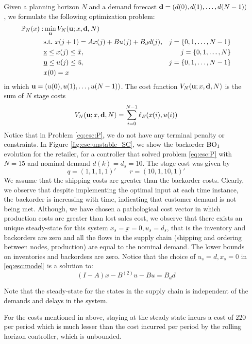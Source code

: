 Given a planning horizon $N$ and a demand forecast $\mathbf{d} = 
(d(0),d(1),\ldots,d(N-1))$, we formulate the following
optimization problem:
\begin{alignat}{2}
\label{eq:esc:P}
\mathbb{P}_N(x):& \min_{\mathbf{u}}{V_N(\mathbf{u};x,\mathbf{d},N)}& \nonumber \\
&\text{s.t.~} x(j+1) = Ax(j) + Bu(j)+B_dd(j),& j =\left\lbrace 0,1,\ldots,N-1 \right\rbrace\nonumber\\
&\underbar{x} \leq x(j) \leq \bar{x},& j = \left\lbrace 0,1,\ldots,N \right\rbrace  \\
&\underbar{u} \leq u(j) \leq \bar{u},&j = \left\lbrace  0,1,\ldots,N-1 \right\rbrace\nonumber \\
& x(0) = x & \nonumber
\end{alignat}
in which $\mathbf{u} = (u(0),u(1),\ldots,u(N-1))$. The cost function
$V_N(\mathbf{u};x,\mathbf{d},N)$ is the sum of $N$ stage costs
\[V_N(\mathbf{u};x,\mathbf{d},N) =  \sum_{i=0}^{N-1}
  \ell_E(x(i),u(i))\]
Notice that in Problem \eqref{eq:esc:P}, we do not have any terminal
penalty or constraints. In Figure \ref{fig:esc:unstable_SC}, we show
the backorder $\textrm{BO}_1$ evolution for the retailer, for a controller
that solved problem \eqref{eq:esc:P} with $N=15$ and nominal demand
$d(k) =d_s= 10$. The stage cost was given by 
\[ q = (1,1,1,1)' \qquad r = (10,1,10,1)' \]
We assume that the shipping costs are greater than the backorder
costs. Clearly, we observe that despite implementing the optimal input at
each time instance, the backorder is increasing with time, indicating
that customer demand is not being met. Although, we have chosen a
pathological cost vector in which production costs are greater than
lost sales cost, we observe that there exists an unique steady-state
for this system $x_s = \underbar{x}=0, u_s = d_s$, that is the inventory
and backorders are zero and all the flows in the supply chain
(shipping and ordering between nodes, production) are equal to the
nominal demand.  The lower bounds on inventories and backorders are
zero. Notice that the choice of $u_s = d, x_s=0$ in \eqref{eq:esc:model}
is a solution to:
\[ (I-A)x -B^{(2)}u- Bu = B_dd \] 

Note that  the steady-state for the states in the supply
chain is independent of the demands and delays in the system.

For the costs mentioned
in above, staying at the steady-state incurs a cost of $220$ per period
which is much lesser than the cost incurred per period by the rolling
horizon controller, which is unbounded.

